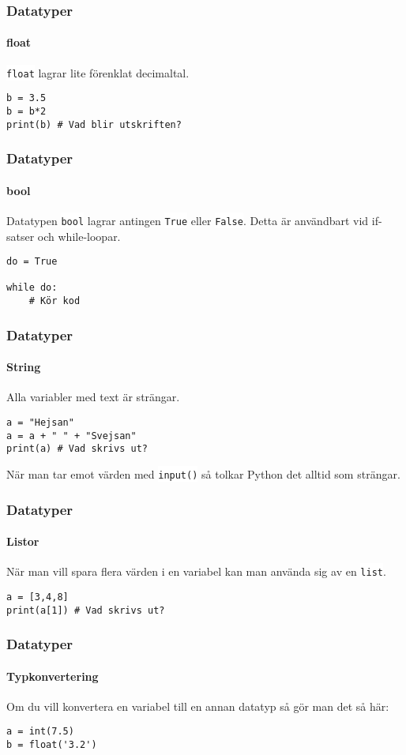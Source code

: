 \documentclass[aspectratio=169]{beamer}
\newcommand{\code}[1]{\colorbox{white}{\lstinline{#1}}}
\begin{document}
\begin{frame}[fragile]
	\frametitle{Datatyper}
	\framesubtitle{float}
	
	\code{float} lagrar lite förenklat decimaltal.
	
	\begin{lstlisting}
b = 3.5
b = b*2
print(b) # Vad blir utskriften?
	\end{lstlisting}
	
\end{frame}

\begin{frame}[fragile]
	\frametitle{Datatyper}
	\framesubtitle{bool}
	
	Datatypen \code{bool} lagrar antingen \code{True} eller \code{False}. Detta är användbart vid if-satser och while-loopar.
	
	\begin{lstlisting}
do = True

while do:
    # Kör kod
	\end{lstlisting}
	
\end{frame}

\begin{frame}[fragile]
	\frametitle{Datatyper}
	\framesubtitle{String}
	
	Alla variabler med text är strängar.
	
	\begin{lstlisting}
a = "Hejsan"
a = a + " " + "Svejsan"
print(a) # Vad skrivs ut?
	\end{lstlisting}
	
	När man tar emot värden med \code{input()} så tolkar Python det alltid som strängar.
	
\end{frame}

\begin{frame}[fragile]
	\frametitle{Datatyper}
	\framesubtitle{Listor}
	
	När man vill spara flera värden i en variabel kan man använda sig av en \code{list}.
	
	\begin{lstlisting}
a = [3,4,8]
print(a[1]) # Vad skrivs ut?
	\end{lstlisting}
	
\end{frame}

\begin{frame}[fragile]
	\frametitle{Datatyper}
	\framesubtitle{Typkonvertering}
	
	Om du vill konvertera en variabel till en annan datatyp så gör man det så här:
	
	\begin{lstlisting}
a = int(7.5)
b = float('3.2')
	\end{lstlisting}
	
\end{frame}
\end{document}

